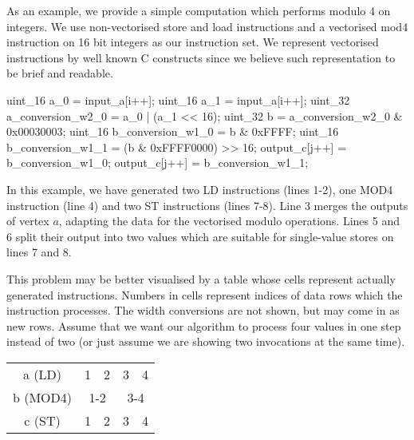 As an example, we provide a simple computation which performs modulo 4 on integers. We use non-vectorised store and load instructions and a vectorised mod4 instruction on 16 bit integers as our instruction set. We represent vectorised instructions by well known C constructs since we believe such representation to be brief and readable.


\mybeginfig
\begin{code}
uint_16 a_0 = input_a[i++];
uint_16 a_1 = input_a[i++];
uint_32 a_conversion_w2_0 = a_0 | (a_1 << 16);
uint_32 b = a_conversion_w2_0 & 0x00030003;
uint_16 b_conversion_w1_0 = b & 0xFFFF;
uint_16 b_conversion_w1_1 = (b & 0xFFFF0000) >> 16;
output_c[j++] = b_conversion_w1_0;
output_c[j++] = b_conversion_w1_1;
\end{code}

In this example, we have generated two LD instructions (lines 1-2), one MOD4 instruction (line 4) and two ST instructions (lines 7-8). Line 3 merges the outputs of vertex $a$, adapting the data for the vectorised modulo operations. Lines 5 and 6 split their output into two values which are suitable for single-value stores on lines 7 and 8.


This problem may be better visualised by a table whose cells represent actually generated instructions. Numbers in cells represent indices of data rows which the instruction processes. The width conversions are not shown, but may come in as new rows. Assume that we want our algorithm to process four values in one step instead of two (or just assume we are showing two invocations at the same time).

\mybeginfig
\begin{center}
\begin{tabular}{c|c|c|c|c|}
  \cline{2-5}
a (LD) & 1 & 2 & 3 & 4\\
  \cline{2-5}
b (MOD4) & \multicolumn{2}{c|}{1-2} & \multicolumn{2}{c|}{3-4}\\
  \cline{2-5}
c (ST) & 1 & 2 & 3 & 4\\
  \cline{2-5}
\end{tabular}
\end{center}

